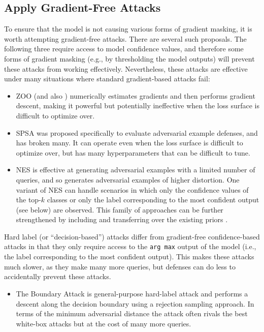 \documentclass{article} %
\begin{document}
\subsection{Apply Gradient-Free Attacks}
\label{sec:gradientfree}

To ensure that the model is not causing
various forms of gradient masking, it is worth attempting
gradient-free attacks.
%
There are several such proposals. The following
three require access to model confidence values, and therefore
some forms of gradient masking (e.g., by thresholding the model
outputs) will prevent these attacks from working effectively.
%
Nevertheless, these attacks are effective under many situations
where standard gradient-based attacks fail:
\begin{itemize}
  \item ZOO \citep{chen2017zoo} (and also \citep{LiuCLS17,bhagoji2018practical,TuTCLZYHC18}) numerically estimates gradients and then
performs gradient descent, making it powerful but potentially
ineffective when the loss surface is difficult to optimize over.
  \item SPSA \citep{uesato2018adversarial} was proposed
specifically to evaluate adversarial example defenses, and has broken
many. It can operate even when the loss surface is difficult to
optimize over, but has many hyperparameters that can be difficult to tune.
  \item NES \citep{ilyas2018black} is effective at generating adversarial examples with a
limited number of queries, and so generates adversarial examples of
higher distortion. One variant of NES can handle scenarios in which only the confidence
values of the top-$k$ classes or only the label corresponding to the most confident output (see below)
are observed.
This family of approaches can be further strengthened by including and transferring over the existing priors \citep{IlyasEM18}.
\end{itemize}

Hard label (or ``decision-based'') attacks differ from gradient-free confidence-based attacks
in that they only require access to the \texttt{arg max} output of the
model (i.e., the label corresponding to the most confident output).
This makes these attacks much slower, as they make many more queries,
but defenses can do less to accidentally prevent these attacks.

\begin{itemize}
  \item The Boundary Attack \citep{brendel2017decision} is general-purpose
  hard-label attack and performs a descent along the decision boundary using a rejection sampling approach.
  In terms of the minimum adversarial distance the attack often rivals the best white-box attacks 
  but at the cost of  many more queries.
\end{itemize}
\end{document}
